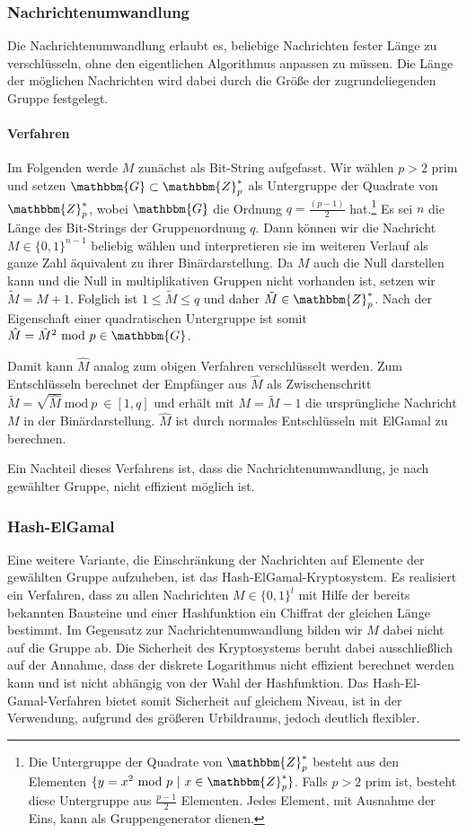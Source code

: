 \subsubsection{Nachrichtenumwandlung}
Die Nachrichtenumwandlung erlaubt es, beliebige Nachrichten fester Länge zu verschlüsseln, ohne den eigentlichen Algorithmus anpassen zu müssen. Die Länge der möglichen Nachrichten wird dabei durch die Größe der zugrundeliegenden Gruppe festgelegt.

\paragraph*{Verfahren}
Im Folgenden werde $M$ zunächst als Bit-String aufgefasst. Wir wählen $p > 2 $ prim und setzen $\mathbbm{G} \subset \mathbbm{Z}^*_p$ als Untergruppe der Quadrate von $\mathbbm{Z}^*_p$, wobei $\mathbbm{G}$ die Ordnung $q = \frac{(p - 1)}{2}$ hat.\footnote{Die Untergruppe der Quadrate von $\mathbbm{Z}^*_p$ besteht aus den Elementen $\{y = x^2 \text{ mod } p\ \vert\ x \in \mathbbm{Z}^*_p\}$. Falls $p > 2$ prim ist, besteht diese Untergruppe aus $\frac{p - 1}{2}$ Elementen. Jedes Element, mit Ausnahme der Eins, kann als Gruppengenerator dienen.}
Es sei $n$ die Länge des Bit-Strings der Gruppenordnung $q$. Dann können wir die Nachricht $M \in \{0, 1\}^{n - 1}$ beliebig wählen und interpretieren sie im weiteren Verlauf als ganze Zahl äquivalent zu ihrer Binärdarstellung. Da $M$ auch die Null darstellen kann und die Null in multiplikativen Gruppen nicht vorhanden ist, setzen wir $\tilde{M} = M + 1$. Folglich ist $ 1 \leq \tilde{M} \leq q$ und daher $\tilde{M} \in \mathbbm{Z}^*_p$. Nach der Eigenschaft einer quadratischen Untergruppe ist somit $\hat{M} = \tilde{M}^2 \text{ mod } p \in \mathbbm{G}$. 

Damit kann $\hat{M}$ analog zum obigen Verfahren verschlüsselt werden. Zum Entschlüsseln berechnet der Empfänger aus $\hat{M}$ als Zwischenschritt $\tilde{M} = \sqrt{\hat{M}}\ \text{mod}\ p\ \in [1, q]$ und erhält mit $M = \tilde{M} - 1$ die ursprüngliche Nachricht $M$ in der Binärdarstellung. $\hat{M}$ ist durch normales Entschlüsseln mit ElGamal zu berechnen.

Ein Nachteil dieses Verfahrens ist, dass die Nachrichtenumwandlung, je nach gewählter Gruppe, nicht effizient möglich ist.

\subsubsection{Hash-ElGamal}
Eine weitere Variante, die Einschränkung der Nachrichten auf Elemente der gewählten Gruppe aufzuheben, ist das Hash-ElGamal-Kryptosystem. Es realisiert ein Verfahren, dass zu allen Nachrichten $M \in \{0, 1\}^l$ mit Hilfe der bereits bekannten Bausteine und einer Hashfunktion ein Chiffrat der gleichen Länge bestimmt. Im Gegensatz zur Nachrichtenumwandlung bilden wir $M$ dabei nicht auf die Gruppe ab. Die Sicherheit des Kryptosystems beruht dabei ausschließlich auf der Annahme, dass der diskrete Logarithmus nicht effizient berechnet werden kann und ist nicht abhängig von der Wahl der Hashfunktion. Das Hash-El-Gamal-Verfahren bietet somit Sicherheit auf gleichem Niveau, ist in der Verwendung, aufgrund des größeren Urbildraums, jedoch deutlich flexibler.

